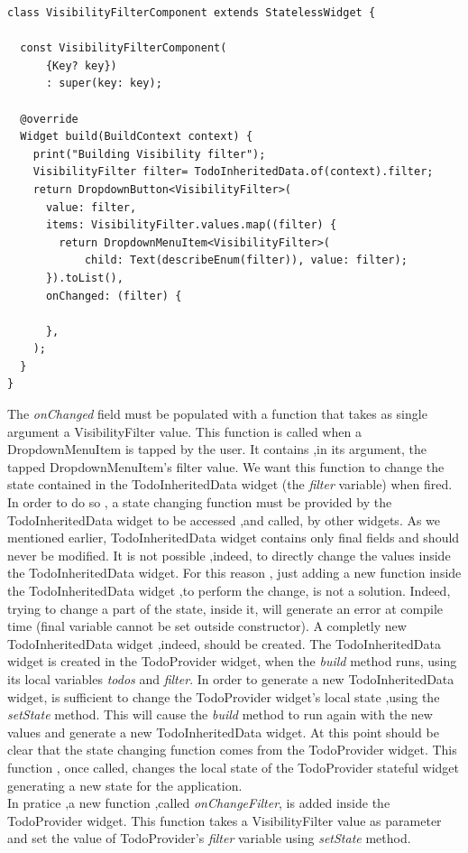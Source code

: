  \mbox{}

\begin{verbatim}
class VisibilityFilterComponent extends StatelessWidget {

  const VisibilityFilterComponent(
      {Key? key})
      : super(key: key);

  @override
  Widget build(BuildContext context) {
    print("Building Visibility filter");
    VisibilityFilter filter= TodoInheritedData.of(context).filter;
    return DropdownButton<VisibilityFilter>(
      value: filter,
      items: VisibilityFilter.values.map((filter) {
        return DropdownMenuItem<VisibilityFilter>(
            child: Text(describeEnum(filter)), value: filter);
      }).toList(),
      onChanged: (filter) {
        
      },
    );
  }
}
\end{verbatim}

The \textit{onChanged  }field must be populated with a function that takes as single argument a VisibilityFilter value. This function is called when a DropdownMenuItem is tapped by the user. It contains ,in its argument, the tapped DropdownMenuItem's filter value.  We want this function to change the state contained in the TodoInheritedData widget (the \textit{filter} variable) when fired. In order to do so , a state changing function must be provided by the TodoInheritedData widget to be accessed ,and called, by other widgets. As we mentioned earlier, TodoInheritedData widget contains only final fields and should never be modified. It is not possible ,indeed, to directly change the values inside the TodoInheritedData widget. For this reason , just adding a new function inside the TodoInheritedData widget ,to perform the change, is not a solution. Indeed, trying to change a part of the state, inside it, will generate an error at compile time (final variable cannot be set outside constructor). A completly new TodoInheritedData widget ,indeed, should be created. The TodoInheritedData widget is created in the TodoProvider widget, when the \textit{build} method runs, using its local variables \textit{todos }and \textit{filter}. In order to generate a new TodoInheritedData widget, is sufficient to change the TodoProvider widget's local state ,using the \textit{setState} method. This will cause the \textit{build} method to run again with the new values and generate a new TodoInheritedData widget. At this point should be clear that the state changing function comes from the TodoProvider widget. This function , once called, changes the local state of the TodoProvider stateful widget generating a new state for the application.\\
In pratice ,a new function ,called \textit{onChangeFilter}, is added inside the TodoProvider widget. This function takes a VisibilityFilter value as parameter and set the  value of TodoProvider's \textit{filter} variable using \textit{setState} method. 

